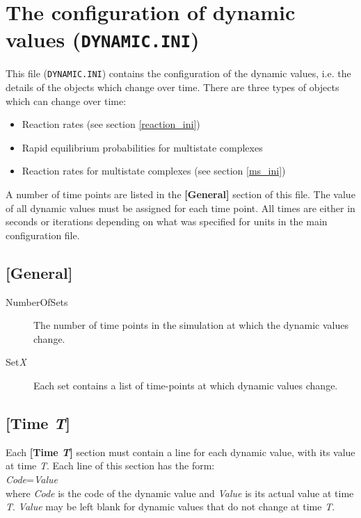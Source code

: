 \section{The configuration of dynamic values (\texttt{DYNAMIC.INI})}\label{dynamic_ini}
This file (\texttt{DYNAMIC.INI}) contains the configuration of the dynamic
values, i.e.  the details of the objects which change over time. There
are three types of objects which can change over time:

\begin{itemize}
\item Reaction rates (see section \ref{reaction_ini})
\item Rapid equilibrium probabilities for multistate complexes
\item Reaction rates for multistate complexes (see section
  \ref{ms_ini})
\end{itemize}

A number of time points are listed in the \textbf{[General]} section
of this file. The value of all dynamic values must be assigned for
each time point.  All times are either in seconds or iterations
depending on what was specified for units in the main configuration
file.

\subsection{[General]}
\begin{description}
\item[NumberOfSets] The number of time points in the simulation at
  which the dynamic values change.

\item[Set\emph{X}] Each set contains a list of time-points at which
  dynamic values change.
\end{description}

\subsection{[Time \emph{T}]}
Each \textbf{[Time \emph{T}]} section must contain a line for each
dynamic value, with its value at time \emph{T}. Each line of this
section has the form:
\\[\baselineskip] 
\emph{Code}=\emph{Value}
\\[\baselineskip]
where \emph{Code} is the code of the dynamic value and
\emph{Value} is its actual value at time \emph{T}.  \emph{Value} may
be left blank for dynamic values that do not change at time \emph{T}.

